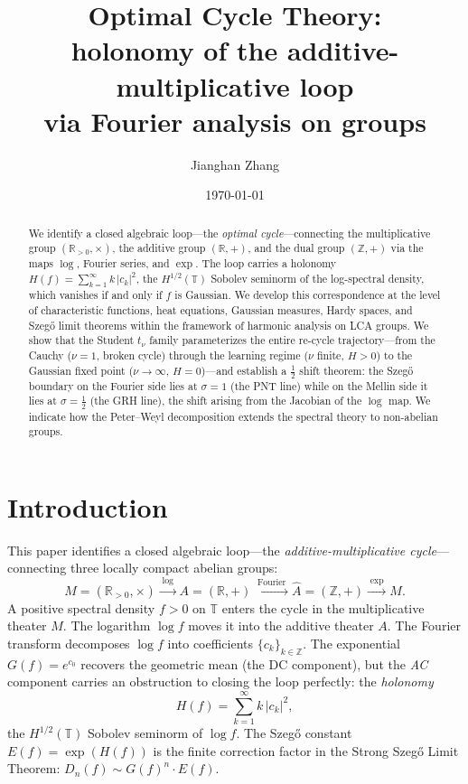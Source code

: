 \documentclass[12pt]{amsart}
\title[Optimal Cycle Theory]{Optimal Cycle Theory:\\ holonomy of the additive-multiplicative loop\\ via Fourier analysis on groups}
\author{Jianghan Zhang}
\date{\today}
\theoremstyle{definition}
\theoremstyle{remark}
\newcommand{\R}{\mathbb{R}}
\newcommand{\Rpos}{\mathbb{R}_{>0}}
\newcommand{\bT}{\mathbb{T}}
\newcommand{\Z}{\mathbb{Z}}
\begin{document}
\begin{abstract}
We identify a closed algebraic loop---the \emph{optimal cycle}---connecting the multiplicative group $(\Rpos, \times)$, the additive group $(\R, +)$, and the dual group $(\Z, +)$ via the maps $\log$, Fourier series, and $\exp$. The loop carries a holonomy $H(f) = \sum_{k=1}^{\infty} k\,|c_k|^2$, the $H^{1/2}(\bT)$ Sobolev seminorm of the log-spectral density, which vanishes if and only if $f$ is Gaussian. We develop this correspondence at the level of characteristic functions, heat equations, Gaussian measures, Hardy spaces, and Szeg\H{o} limit theorems within the framework of harmonic analysis on LCA groups. We show that the Student $t_\nu$ family parameterizes the entire re-cycle trajectory---from the Cauchy ($\nu=1$, broken cycle) through the learning regime ($\nu$ finite, $H > 0$) to the Gaussian fixed point ($\nu \to \infty$, $H = 0$)---and establish a $\tfrac{1}{2}$ shift theorem: the Szeg\H{o} boundary on the Fourier side lies at $\sigma = 1$ (the PNT line) while on the Mellin side it lies at $\sigma = \tfrac{1}{2}$ (the GRH line), the shift arising from the Jacobian of the $\log$ map. We indicate how the Peter--Weyl decomposition extends the spectral theory to non-abelian groups.
\end{abstract}

\maketitle

\section*{Introduction}

This paper identifies a closed algebraic loop---the \emph{additive-multiplicative cycle}---connecting three locally compact abelian groups:
\[
M = (\Rpos, \times)
\xrightarrow{\;\log\;}
A = (\R, +)
\xrightarrow{\;\text{Fourier}\;}
\widehat{A} = (\Z, +)
\xrightarrow{\;\exp\;}
M.
\]
A positive spectral density $f > 0$ on $\bT$ enters the cycle in the multiplicative theater $M$. The logarithm $\log f$ moves it into the additive theater $A$. The Fourier transform decomposes $\log f$ into coefficients $\{c_k\}_{k \in \Z}$. The exponential $G(f) = e^{c_0}$ recovers the geometric mean (the DC component), but the \emph{AC} component carries an obstruction to closing the loop perfectly: the \emph{holonomy}
\[
H(f) = \sum_{k=1}^{\infty} k\,|c_k|^2,
\]
the $H^{1/2}(\bT)$ Sobolev seminorm of $\log f$. The Szeg\H{o} constant $E(f) = \exp(H(f))$ is the finite correction factor in the Strong Szeg\H{o} Limit Theorem: $D_n(f) \sim G(f)^n \cdot E(f)$.
\end{document}
